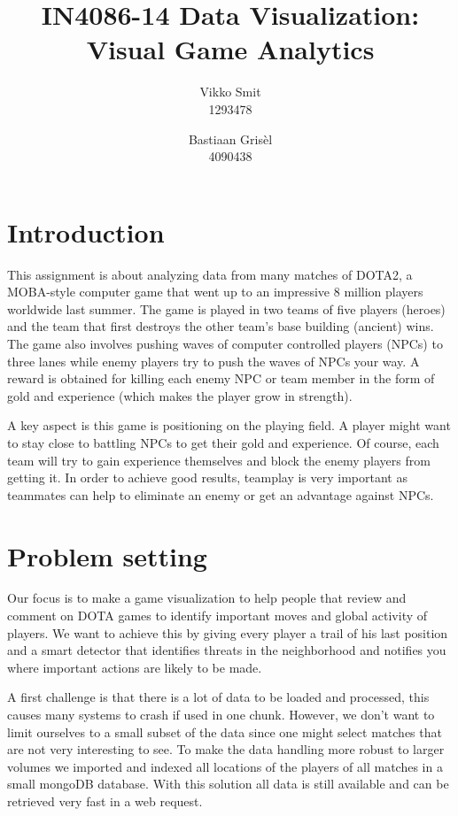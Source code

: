 \documentclass[a4paper]{article}
\title{IN4086-14  Data Visualization: Visual Game Analytics} %
\author{Vikko Smit\\ %
1293478
\and
Bastiaan Gris\`el\\
4090438
}
\theoremstyle{plain} %
\theoremstyle{definition} %
\begin{document}
\maketitle %

\section*{Introduction}
This assignment is about analyzing data from many matches of DOTA2, a MOBA-style computer game that went up to an impressive 8 million players worldwide last summer. 
The game is played in two teams of five players (heroes) and the team that first destroys the other team's base building (ancient) wins. 
The game also involves pushing waves of computer controlled players (NPCs) to three lanes while enemy players try to push the waves of NPCs your way. 
A reward is obtained for killing each enemy NPC or team member in the form of gold and experience (which makes the player grow in strength).

A key aspect is this game is positioning on the playing field. 
A player might want to stay close to battling NPCs to get their gold and experience. 
Of course, each team will try to gain experience themselves and block the enemy players from getting it. 
In order to achieve good results, teamplay is very important as teammates can help to eliminate an enemy or get an advantage against NPCs.

\section*{Problem setting}
Our focus is to make a game visualization to help people that review and comment on DOTA games to identify important moves and global activity of players. 
We want to achieve this by giving every player a trail of his last position and a smart detector that identifies threats in the neighborhood and notifies you where important actions are likely to be made.

A first challenge is that there is a lot of data to be loaded and processed, this causes many systems to crash if used in one chunk. 
However, we don't want to limit ourselves to a small subset of the data since one might select matches that are not very interesting to see.
To make the data handling more robust to larger volumes we imported and indexed all locations of the players of all matches in a small mongoDB database. 
With this solution all data is still available and can be retrieved very fast in a web request.
\end{document}
